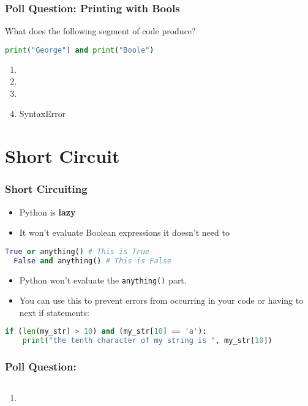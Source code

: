 \documentclass{beamer}
\begin{document}
%
%
\begin{frame}[fragile]
  \frametitle{Poll Question: Printing with Bools}
  What does the following segment of code produce?
  \begin{lstlisting}[language=Python, autogobble]
  print("George") and print("Boole")
  \end{lstlisting}
  \vfill
  \begin{enumerate}[A]
    \item {}
    \item {}
    \item {}
    \item SyntaxError
  \end{enumerate}
\end{frame}

%
%
\section{Short Circuit}
\begin{frame}[fragile]
  \frametitle{Short Circuiting}
  \begin{itemize}
    \item Python is \textbf{lazy} 
    \item It won't evaluate Boolean expressions it doesn't need to
  \end{itemize}
  \vfill
  \begin{lstlisting}[language=Python, autogobble]
  True or anything() # This is True 
  False and anything() # This is False
  \end{lstlisting}
  \vfill
  \begin{itemize}
    \item Python won't evaluate the \lstinline|anything()| part.
    \item You can use this to prevent errors from occurring in your code or having to next if statements:
  \end{itemize}
  \vfill
  \begin{lstlisting}[language=Python, autogobble]
  if (len(my_str) > 10) and (my_str[10] == 'a'):
    print("the tenth character of my string is ", my_str[10])
  \end{lstlisting}
  \vfill
\end{frame}

%
%
\begin{frame}[fragile]
  \frametitle{Poll Question: }

  \begin{lstlisting}[language=Python, autogobble]

  \end{lstlisting}
  \vfill
  \begin{enumerate}[A]
    \item 
  \end{enumerate}
\end{frame}
\end{document}
